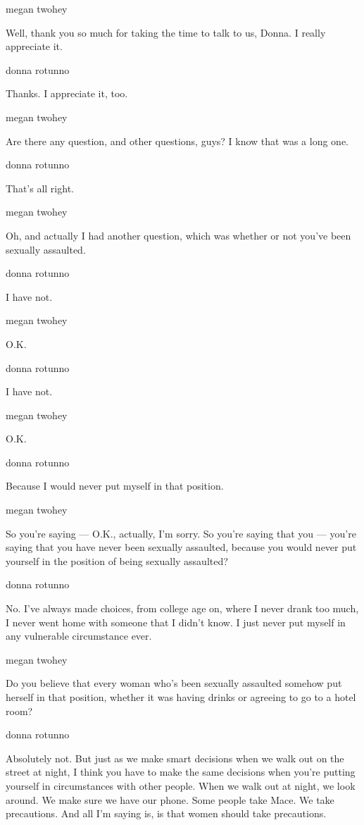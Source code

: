 megan twohey

Well, thank you so much for taking the time to talk to us, Donna. I
really appreciate it.

donna rotunno

Thanks. I appreciate it, too.

megan twohey

Are there any question, and other questions, guys? I know that was a
long one.

donna rotunno

That's all right.

megan twohey

Oh, and actually I had another question, which was whether or not you've
been sexually assaulted.

donna rotunno

I have not.

megan twohey

O.K.

donna rotunno

I have not.

megan twohey

O.K.

donna rotunno

Because I would never put myself in that position.

megan twohey

So you're saying --- O.K., actually, I'm sorry. So you're saying that
you --- you're saying that you have never been sexually assaulted,
because you would never put yourself in the position of being sexually
assaulted?

donna rotunno

No. I've always made choices, from college age on, where I never drank
too much, I never went home with someone that I didn't know. I just
never put myself in any vulnerable circumstance ever.

megan twohey

Do you believe that every woman who's been sexually assaulted somehow
put herself in that position, whether it was having drinks or agreeing
to go to a hotel room?

donna rotunno

Absolutely not. But just as we make smart decisions when we walk out on
the street at night, I think you have to make the same decisions when
you're putting yourself in circumstances with other people. When we walk
out at night, we look around. We make sure we have our phone. Some
people take Mace. We take precautions. And all I'm saying is, is that
women should take precautions.

